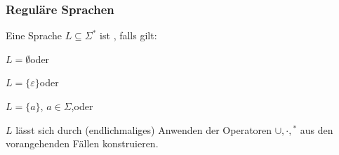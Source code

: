     \begin{frame}
      \frametitle{Reguläre Sprachen}
      
      \begin{Definition}
        Eine Sprache $L \subseteq \Sigma^*$ ist , falls gilt:
        \begin{Itemize}
          \item
            $L=\emptyset$\quad oder
          \item
            $L=\{\varepsilon\}$\quad oder
          \item
            $L=\{a\}$, $a \in \Sigma$,\quad oder
          \item
            $L$ lässt sich durch (endlichmaliges) Anwenden der Operatoren
            $\cup,\cdot,{}^*$ aus den vorangehenden Fällen konstruieren.
            \label{def:reg_sprache}%
        \end{Itemize}
        
      \end{Definition}

      \par\bigskip

    \end{frame}

